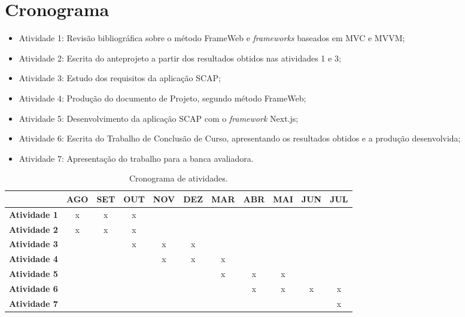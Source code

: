 \section{Cronograma}
\label{sec-intro-crono}

\begin{itemize}
\item Atividade 1: Revisão bibliográfica sobre o método FrameWeb e \textit{frameworks} baseados em MVC e MVVM;
\item Atividade 2: Escrita do anteprojeto a partir dos resultados obtidos nas atividades 1 e 3;
\item Atividade 3: Estudo dos requisitos da aplicação SCAP;
\item Atividade 4: Produção do documento de Projeto, segundo método FrameWeb;
\item Atividade 5: Desenvolvimento da aplicação SCAP com o \textit{framework} Next.js;
\item Atividade 6: Escrita do Trabalho de Conclusão de Curso, apresentando os resultados obtidos e a produção desenvolvida;
\item Atividade 7: Apresentação do trabalho para a banca avaliadora.
\end{itemize}

\begin{table}[h]
    \centering
    \small %
    \setlength{\tabcolsep}{4pt} %
    \begin{tabular}{c|*{10}{c|}}
        \cline{2-11}
        \multicolumn{1}{l|}{} & \textbf{AGO} & \textbf{SET} & \textbf{OUT} & \textbf{NOV} & \textbf{DEZ} & \textbf{MAR} & \textbf{ABR} & \textbf{MAI} & \textbf{JUN} & \textbf{JUL} \\ \hline
        \multicolumn{1}{|c|}{\textbf{Atividade 1}} & x & x & x &   &   &   &   &   &   &   \\ \hline
        \multicolumn{1}{|c|}{\textbf{Atividade 2}} & x & x & x &   &   &   &   &   &   &   \\ \hline
        \multicolumn{1}{|c|}{\textbf{Atividade 3}} &   &   & x & x & x &   &   &   &   &   \\ \hline
        \multicolumn{1}{|c|}{\textbf{Atividade 4}} &   &   &   & x & x & x &   &   &   &   \\ \hline
        \multicolumn{1}{|c|}{\textbf{Atividade 5}} &   &   &   &   &   & x & x & x &   &   \\ \hline
        \multicolumn{1}{|c|}{\textbf{Atividade 6}} &   &   &   &   &   &   & x & x & x & x \\ \hline
        \multicolumn{1}{|c|}{\textbf{Atividade 7}} &   &   &   &   &   &   &   &   &   & x \\ \hline
    \end{tabular}
    \caption{Cronograma de atividades.}
\end{table}


